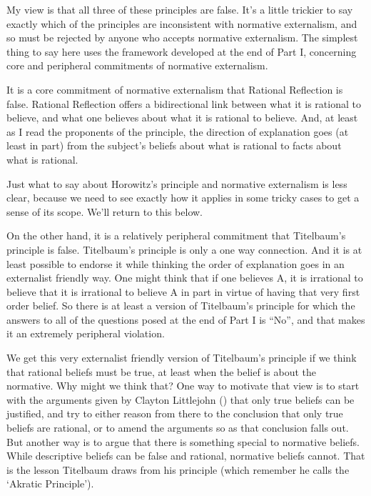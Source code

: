\documentclass[
  10pt,
  letterpaper,
  twoside]{scrbook}
\begin{document}
My view is that all three of these principles are false. It's a little
trickier to say exactly which of the principles are inconsistent with
normative externalism, and so must be rejected by anyone who accepts
normative externalism. The simplest thing to say here uses the framework
developed at the end of Part I, concerning core and peripheral
commitments of normative externalism.

It is a core commitment of normative externalism that Rational
Reflection is false. Rational Reflection offers a bidirectional link
between what it is rational to believe, and what one believes about what
it is rational to believe. And, at least as I read the proponents of the
principle, the direction of explanation goes (at least in part) from the
subject's beliefs about what is rational to facts about what is
rational.

Just what to say about Horowitz's principle and normative externalism is
less clear, because we need to see exactly how it applies in some tricky
cases to get a sense of its scope. We'll return to this below.

On the other hand, it is a relatively peripheral commitment that
Titelbaum's principle is false. Titelbaum's principle is only a one way
connection. And it is at least possible to endorse it while thinking the
order of explanation goes in an externalist friendly way. One might
think that if one believes A, it is irrational to believe that it is
irrational to believe A in part in virtue of having that very first
order belief. So there is at least a version of Titelbaum's principle
for which the answers to all of the questions posed at the end of Part I
is ``No'', and that makes it an extremely peripheral violation.

We get this very externalist friendly version of Titelbaum's principle
if we think that rational beliefs must be true, at least when the belief
is about the normative. Why might we think that? One way to motivate
that view is to start with the arguments given by Clayton Littlejohn
() that only true beliefs can be
justified, and try to either reason from there to the conclusion that
only true beliefs are rational, or to amend the arguments so as that
conclusion falls out. But another way is to argue that there is
something special to normative beliefs. While descriptive beliefs can be
false and rational, normative beliefs cannot. That is the lesson
Titelbaum draws from his principle (which remember he calls the `Akratic
Principle').
\end{document}

